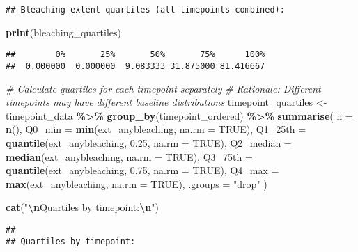 \documentclass[
]{article}
\newenvironment{Shaded}{\begin{snugshade}}{\end{snugshade}}
\newcommand{\AttributeTok}[1]{\textcolor[rgb]{0.13,0.29,0.53}{#1}}
\newcommand{\CommentTok}[1]{\textcolor[rgb]{0.56,0.35,0.01}{\textit{#1}}}
\newcommand{\ConstantTok}[1]{\textcolor[rgb]{0.56,0.35,0.01}{#1}}
\newcommand{\FloatTok}[1]{\textcolor[rgb]{0.00,0.00,0.81}{#1}}
\newcommand{\FunctionTok}[1]{\textcolor[rgb]{0.13,0.29,0.53}{\textbf{#1}}}
\newcommand{\NormalTok}[1]{#1}
\newcommand{\OtherTok}[1]{\textcolor[rgb]{0.56,0.35,0.01}{#1}}
\newcommand{\SpecialCharTok}[1]{\textcolor[rgb]{0.81,0.36,0.00}{\textbf{#1}}}
\newcommand{\StringTok}[1]{\textcolor[rgb]{0.31,0.60,0.02}{#1}}
\begin{document}
\begin{verbatim}
## Bleaching extent quartiles (all timepoints combined):
\end{verbatim}

\begin{Shaded}
\begin{Highlighting}[]
\FunctionTok{print}\NormalTok{(bleaching\_quartiles)}
\end{Highlighting}
\end{Shaded}

\begin{verbatim}
##        0%       25%       50%       75%      100% 
##  0.000000  0.000000  9.083333 31.875000 81.416667
\end{verbatim}

\begin{Shaded}
\begin{Highlighting}[]
\CommentTok{\# Calculate quartiles for each timepoint separately}
\CommentTok{\# Rationale: Different timepoints may have different baseline distributions}
\NormalTok{timepoint\_quartiles }\OtherTok{\textless{}{-}}\NormalTok{ timepoint\_data }\SpecialCharTok{\%\textgreater{}\%}
  \FunctionTok{group\_by}\NormalTok{(timepoint\_ordered) }\SpecialCharTok{\%\textgreater{}\%}
  \FunctionTok{summarise}\NormalTok{(}
    \AttributeTok{n =} \FunctionTok{n}\NormalTok{(),}
    \AttributeTok{Q0\_min =} \FunctionTok{min}\NormalTok{(ext\_anybleaching, }\AttributeTok{na.rm =} \ConstantTok{TRUE}\NormalTok{),}
    \AttributeTok{Q1\_25th =} \FunctionTok{quantile}\NormalTok{(ext\_anybleaching, }\FloatTok{0.25}\NormalTok{, }\AttributeTok{na.rm =} \ConstantTok{TRUE}\NormalTok{),}
    \AttributeTok{Q2\_median =} \FunctionTok{median}\NormalTok{(ext\_anybleaching, }\AttributeTok{na.rm =} \ConstantTok{TRUE}\NormalTok{),}
    \AttributeTok{Q3\_75th =} \FunctionTok{quantile}\NormalTok{(ext\_anybleaching, }\FloatTok{0.75}\NormalTok{, }\AttributeTok{na.rm =} \ConstantTok{TRUE}\NormalTok{),}
    \AttributeTok{Q4\_max =} \FunctionTok{max}\NormalTok{(ext\_anybleaching, }\AttributeTok{na.rm =} \ConstantTok{TRUE}\NormalTok{),}
    \AttributeTok{.groups =} \StringTok{"drop"}
\NormalTok{  )}

\FunctionTok{cat}\NormalTok{(}\StringTok{"}\SpecialCharTok{\textbackslash{}n}\StringTok{Quartiles by timepoint:}\SpecialCharTok{\textbackslash{}n}\StringTok{"}\NormalTok{)}
\end{Highlighting}
\end{Shaded}

\begin{verbatim}
## 
## Quartiles by timepoint:
\end{verbatim}
\end{document}
